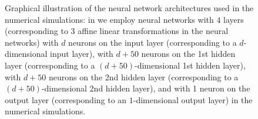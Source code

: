 \begin{figure}
	\caption{Graphical illustration of the neural network architectures used in the numerical simulations: in  we employ neural networks with $4$ layers
	(corresponding to $3$ affine linear transformations in the neural networks) 
	with $d$ neurons on the input layer (corresponding to a $d$-dimensional input layer), 
	with $d + 50$ neurons on the 1st hidden layer (corresponding to a $(d+50)$-dimensional 1st hidden layer),
	with $d + 50$ neurons on the 2nd hidden layer (corresponding to a $(d+50)$-dimensional 2nd hidden layer), and 
	with 1 neuron on the output layer (corresponding to an $1$-dimensional output layer) in the numerical simulations. 
	}
	\label{fig:nn}
\end{figure}

